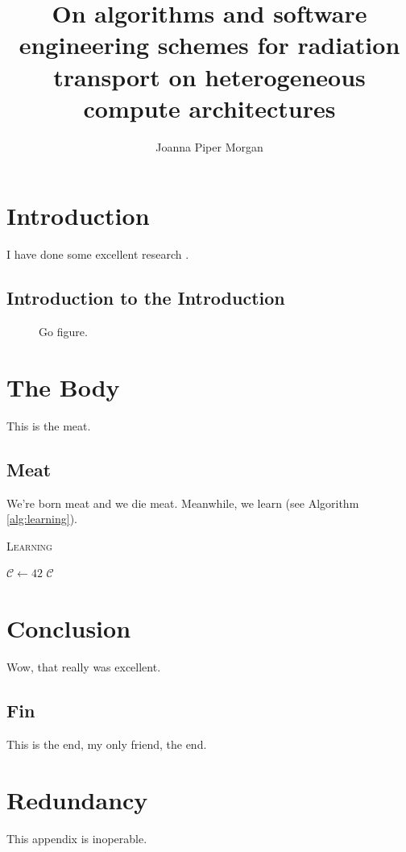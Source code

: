 \documentclass[onehalf,11pt]{beavtex}
\title{On algorithms and software engineering schemes for radiation transport on heterogeneous compute architectures}
\author{Joanna Piper Morgan}
\begin{document}
\maketitle

\mainmatter

\chapter{Introduction}
I have done some excellent research \cite{matrix}.
\section{Introduction to the Introduction}
\begin{figure}[!ht]
\centering
{}
\caption{Go figure.}
\end{figure}

\chapter{The Body}
This is the meat.
\section{Meat}
We're born meat and we die meat. Meanwhile, we learn (see Algorithm \ref{alg:learning}).

\begin{algorithm}[h]
\caption{\textsc{Learning}}
\label{alg:learning}
\begin{algorithmic}[1]
	\STATE $\mathcal{C} \gets 42$
	\RETURN $\mathcal{C}$
\end{algorithmic}
\end{algorithm}

\chapter{Conclusion}
Wow, that really was excellent.
\section{Fin}
This is the end, my only friend, the end.





\appendix
\chapter{Redundancy}
This appendix is inoperable.
\end{document}
